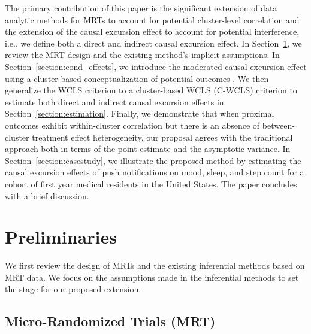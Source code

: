 \documentclass[12pt]{article}
\begin{document}
The primary contribution of this paper is the significant extension of data analytic methods for MRTs to account for potential cluster-level correlation and the extension of the causal excursion effect to account for potential interference, i.e., we define both a direct and indirect causal excursion effect.  In Section~\ref{section:preliminaries}, we review the MRT design and the existing method's implicit assumptions.  In Section~\ref{section:cond_effects}, we introduce the moderated causal excursion effect using a cluster-based conceptualization of potential outcomes \citep{Hong2006,Vanderweele2013}.  We then generalize the WCLS criterion to a cluster-based WCLS (C-WCLS) criterion to estimate both direct and indirect causal excursion effects in Section~\ref{section:estimation}.  Finally, we demonstrate that when proximal outcomes exhibit within-cluster correlation but there is an absence of between-cluster treatment effect heterogeneity, our proposal agrees with the traditional approach both in terms of the point estimate and the asymptotic variance.  In Section~\ref{section:casestudy}, we illustrate the proposed method by estimating the causal excursion effects of push notifications on mood, sleep, and step count for a cohort of first year medical residents in the United States. The paper concludes with a brief discussion.

\section{Preliminaries}
\label{section:preliminaries}

We first review the design of MRTs and the existing inferential methods based on MRT data. We focus on the assumptions made in the inferential methods to set the stage for our proposed extension.

\subsection{Micro-Randomized Trials (MRT)}
\end{document}
